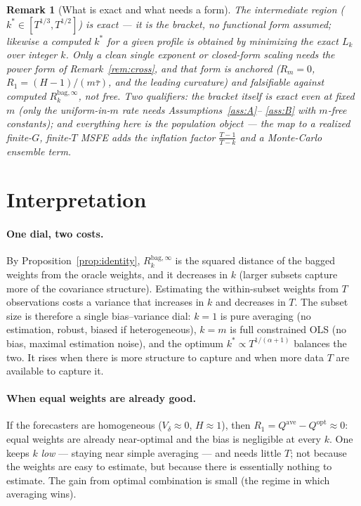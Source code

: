 \documentclass[11pt]{article}
\newcommand{\Rk}{R_k^{\mathrm{bag},\infty}}
\newcommand{\Qopt}{Q^{\mathrm{opt}}}
\newcommand{\Qave}{Q^{\mathrm{ave}}}
\newtheorem{remark}{Remark}
\begin{document}
\begin{remark}[What is exact and what needs a form]\label{rem:epist}
The intermediate \emph{region} ($k^\ast\in[T^{1/3},T^{1/2}]$) is exact --- it is the
bracket, no functional form assumed; likewise a computed $k^\ast$ for a given profile is
obtained by minimizing the exact $L_k$ over integer $k$. Only a \emph{clean single
exponent} or closed-form scaling needs the power form of Remark~\ref{rem:cross}, and that
form is anchored ($R_m=0$, $R_1=(H-1)/(m\bar\tau)$, and the leading curvature) and
falsifiable against computed $\Rk$, not free. Two qualifiers: the bracket itself is exact
even at fixed $m$ (only the uniform-in-$m$ \emph{rate} needs Assumptions~\ref{ass:A}--%
\ref{ass:B} with $m$-free constants); and everything here is the population object --- the
map to a realized finite-$G$, finite-$T$ MSFE adds the inflation factor $\frac{T-1}{T-k}$
and a Monte-Carlo ensemble term.
\end{remark}

\section{Interpretation}\label{sec:interp}

\paragraph{One dial, two costs.} By Proposition~\ref{prop:identity}, $\Rk$ is the squared
distance of the bagged weights from the oracle weights, and it decreases in $k$ (larger
subsets capture more of the covariance structure). Estimating the within-subset weights
from $T$ observations costs a variance that increases in $k$ and decreases in $T$. The
subset size is therefore a single bias--variance dial: $k=1$ is pure averaging (no
estimation, robust, biased if heterogeneous), $k=m$ is full constrained OLS (no bias,
maximal estimation noise), and the optimum $k^\ast\propto T^{1/(\alpha+1)}$ balances the
two. It rises when there is more structure to capture and when more data $T$ are available
to capture it.

\paragraph{When equal weights are already good.} If the forecasters are homogeneous
($V_\delta\approx0$, $H\approx1$), then $R_1=\Qave-\Qopt\approx0$: equal weights are already
near-optimal and the bias is negligible at every $k$. One keeps $k$ \emph{low} --- staying
near simple averaging --- and needs little $T$; not because the weights are easy to
estimate, but because there is essentially nothing to estimate. The gain from optimal
combination is small (the regime in which averaging wins).
\end{document}

